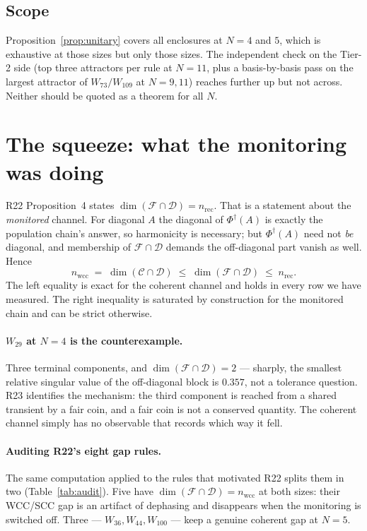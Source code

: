 \documentclass[11pt]{article}
\newcommand{\Phid}{\Phi^{\dagger}}
\newcommand{\C}{\mathcal{C}}
\newcommand{\F}{\mathcal{F}}
\newcommand{\D}{\mathcal{D}}
\theoremstyle{plain}
\theoremstyle{remark}
\begin{document}
\subsection{Scope}

Proposition~\ref{prop:unitary} covers all enclosures at $N = 4$ and $5$, which
is exhaustive at those sizes but only those sizes. The independent check on the
Tier-2 side (top three attractors per rule at $N=11$, plus a basis-by-basis pass
on the largest attractor of $W_{73}/W_{109}$ at $N=9,11$) reaches further up but
not across. Neither should be quoted as a theorem for all $N$.

\section{The squeeze: what the monitoring was doing}%
\label{sec:squeeze}

R22 Proposition~4 states $\dim(\F\cap\D) = n_{\mathrm{rec}}$. That is a
statement about the \emph{monitored} channel. For diagonal $A$ the diagonal of
$\Phid(A)$ is exactly the population chain's answer, so harmonicity is
necessary; but $\Phid(A)$ need not \emph{be} diagonal, and membership of
$\F\cap\D$ demands the off-diagonal part vanish as well. Hence
\begin{equation}
  n_{\mathrm{wcc}} \;=\; \dim(\C\cap\D)
  \;\le\; \dim(\F\cap\D) \;\le\; n_{\mathrm{rec}} .
  \label{eq:squeeze}
\end{equation}
The left equality is exact for the coherent channel and holds in every row we
have measured. The right inequality is saturated by construction for the
monitored chain and can be strict otherwise.

\paragraph{\texorpdfstring{$W_{29}$ at $N=4$}{W29 at N=4} is the counterexample.} Three terminal components,
and $\dim(\F\cap\D) = 2$ --- sharply, the smallest relative singular value of
the off-diagonal block is $0.357$, not a tolerance question. R23 identifies the
mechanism: the third component is reached from a shared transient by a fair
coin, and a fair coin is not a conserved quantity. The coherent channel simply
has no observable that records which way it fell.

\paragraph{Auditing R22's eight gap rules.} The same computation applied to the
rules that motivated R22 splits them in two (Table~\ref{tab:audit}). Five have
$\dim(\F\cap\D) = n_{\mathrm{wcc}}$ at both sizes: their WCC/SCC gap is an
artifact of dephasing and disappears when the monitoring is switched off. Three
--- $W_{36}, W_{44}, W_{100}$ --- keep a genuine coherent gap at $N=5$.
\end{document}
